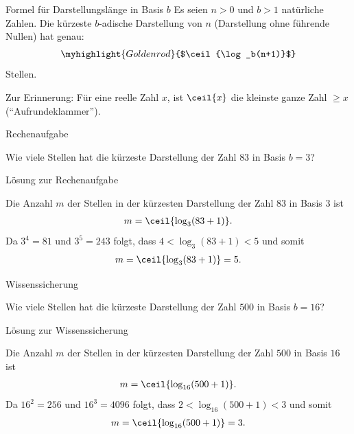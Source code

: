\begin{frame}{Formel für Darstellungslänge in Basis $b$}
	Es seien $n>0$ und $b>1$ natürliche Zahlen. Die kürzeste $b$-adische Darstellung von $n$ (Darstellung ohne führende Nullen) hat genau:
	\begin{align*}
		\myhighlight{Goldenrod}{$\ceil{\log_b(n+1)}$}
	\end{align*}
	Stellen.

	\vspace{0.5cm}
	Zur Erinnerung: Für eine reelle Zahl $x$, ist $\ceil{x}$ die kleinste ganze Zahl $\geq x$ (\enquote{Aufrundeklammer}).
\end{frame}

\begin{frame}{Rechenaufgabe}
	\begin{myexercise}\label{myexercise:001}
		Wie viele Stellen hat die kürzeste Darstellung der Zahl $83$ in Basis $b = 3$?
	\end{myexercise}
\end{frame}

\begin{frame}{Lösung zur Rechenaufgabe}
	\begin{myanswer}
		Die Anzahl $m$ der Stellen in der kürzesten Darstellung der Zahl $83$ in Basis $3$ ist
		\begin{align*}
			m = \ceil{\log_3(83 + 1)}.
		\end{align*}
		Da $3^4 = 81$ und $3^5 = 243$ folgt, dass $4 < \log_3(83 + 1) < 5$ und somit
		\begin{align*}
			m = \ceil{\log_3(83 + 1)} = 5.
		\end{align*}
	\end{myanswer}
\end{frame}

\begin{frame}{Wissenssicherung}
	\begin{myexercise}\label{myexercise:002}
		Wie viele Stellen hat die kürzeste Darstellung der Zahl $500$ in Basis $b = 16$?
	\end{myexercise}
\end{frame}

\begin{frame}{Lösung zur Wissenssicherung}
	\begin{myanswer}
		Die Anzahl $m$ der Stellen in der kürzesten Darstellung der Zahl $500$ in Basis $16$ ist
		\begin{align*}
			m = \ceil{\log_{16}(500 + 1)}.
		\end{align*}
		Da $16^2 = 256$ und $16^3 = 4096$ folgt, dass $2 < \log_{16}(500 + 1) < 3$ und somit
		\begin{align*}
			m = \ceil{\log_{16}(500 + 1)} = 3.
		\end{align*}
	\end{myanswer}
\end{frame}

